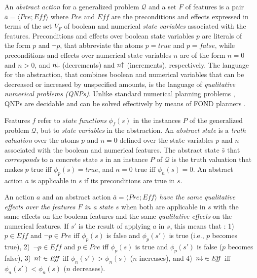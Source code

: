 \documentclass[letterpaper]{article} %
\newcommand{\tup}[1]{\langle #1 \rangle}
\newcommand{\Q}{\mathcal{Q}}
\newcommand{\Eff}{{\mathit{Eff}}}
\newcommand{\abst}[2]{\tup{#1;#2}}
\newcommand{\pplus}{\hspace{-.05em}\raisebox{.15ex}{\footnotesize$\uparrow$}}
\newcommand{\mminus}{\hspace{-.05em}\raisebox{.15ex}{\footnotesize$\downarrow$}}
\begin{document}
An \emph{abstract action}  for a generalized problem $\Q$ and a set $F$ of features
is a pair $\bar{a}=\abst{Pre}{\Eff}$ where $Pre$ and $\Eff$ are the  preconditions
and effects expressed in terms of the  set $V_F$ of boolean and numerical \emph{state variables}
associated with the features. Preconditions and effects over boolean state variables $p$ are literals of the form $p$
and $\neg p$, that abbreviate the  atoms $p=true$ and $p=false$, while
preconditions and effects over  numerical state variables $n$ are of  the form $n=0$ and $n > 0$,
and   $n\mminus$ (decrements) and  $n\pplus$ (increments), respectively.
The language for the abstraction,  that combines boolean and numerical variables
that can be decreased or increased by unspecified amounts, is the language of \emph{qualitative numerical problems (QNPs)}.
Unlike standard numerical planning problems \cite{helmert:numerical}, QNPs
are decidable and can be solved effectively by means of  FOND planners \cite{srivastava:aaai2011,bonet:ijcai2017}.


Features $f$ refer to \emph{state functions} $\phi_f(s)$ in the instances $P$
of the generalized problem $\Q$, but  to \emph{state variables} in  the abstraction.
An \emph{abstract state} is  a \emph{truth valuation} over
the atoms $p$ and $n=0$ defined over the state variables $p$ and $n$
associated with the boolean and  numerical features.
The abstract state $\bar{s}$ that \emph{corresponds} to a concrete state $s$
in an instance $P$ of $\Q$ is the truth valuation that makes $p$ true iff $\phi_p(s)=true$,
and $n=0$ true iff $\phi_n(s) = 0$. An abstract action $\bar{a}$ is applicable in  $s$
if its preconditions are true in $\bar{s}$.

An action $a$ and an abstract action $\bar{a}=\abst{Pre}{\Eff}$  \emph{have  the same qualitative effects over the features $F$
in a state $s$} when both are applicable in $s$ with the same effects on the boolean features and
the same \emph{qualitative effects} on the numerical features. If $s'$ is the result of applying $a$ in $s$,
this means that \cite{bonet:ijcai2018}:
1)~$p \in \Eff$ and $\neg p \in Pre$ iff
$\phi_p(s)$ is false and $\phi_p(s')$ is true (i.e., $p$ becomes true),
%
2)~$\neg p \in \Eff$ and $p \in Pre$ iff
$\phi_p(s)$ is true and $\phi_p(s')$ is false ($p$ becomes false),
%
3)~$n\pplus \in \Eff$ iff $\phi_n(s') > \phi_n(s)$ ($n$ increases),
and 
%
4)~$n\mminus \in \Eff$ iff $\phi_n(s') < \phi_n(s)$ ($n$ decreases).
\end{document}
